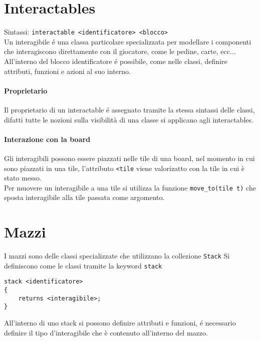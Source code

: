 \section{Interactables}
Sintassi: \lstinline|interactable <identificatore> <blocco>| \\
Un interagibile é una classa particolare specializzata per modellare i componenti che interagiscono
direttamente con il giocatore, come le pedine, carte, ecc... \\
All'interno del blocco identificatore é possibile, come nelle classi, definire attributi,
funzioni e azioni al suo interno. 

\paragraph{Proprietario}
Il proprietario di un interactable é assegnato tramite la stessa sintassi delle classi,
difatti tutte le nozioni sulla visibilità di una classe si applicano agli interactables.

\paragraph{Interazione con la board}
Gli interagibili possono essere piazzati nelle tile di una board, nel momento in cui sono piazzati
in una tile, l'attributo \lstinline|<tile| viene valorizatto con la tile in cui è stato messo. \\
Per muovere un interagibile a una tile si utilizza la funzione \lstinline|move_to(tile t)| che
sposta interagibile alla tile passata come argomento. \\ 


\section{Mazzi}
I mazzi sono delle classi specializzate che utilizzano la collezione \lstinline|Stack| 
Si definiscono come le classi tramite la keyword \lstinline|stack|
\begin{lstlisting}
stack <identificatore> 
{ 
    returns <interagibile>;
}
\end{lstlisting}
All'interno di uno stack si possono definire attributi e funzioni, 
é necessario definire il tipo d'interagibile che è contenuto all'interno del mazzo.  

